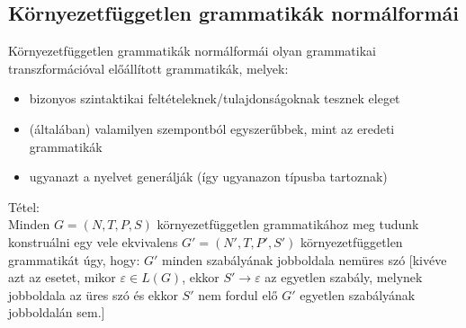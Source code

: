 \documentclass[margin=0px]{article}
\begin{document}
\subsection{Környezetfüggetlen grammatikák normálformái}
Környezetfüggetlen grammatikák normálformái olyan grammatikai transzformációval előállított  grammatikák, melyek:
\begin{itemize}
    \item bizonyos szintaktikai feltételeknek/tulajdonságoknak tesznek eleget
    \item (általában) valamilyen szempontból egyszerűbbek, mint az eredeti grammatikák
    \item ugyanazt a nyelvet generálják (így ugyanazon típusba tartoznak)
\end{itemize}
Tétel:\\
Minden $G = (N, T, P, S)$ környezetfüggetlen grammatikához meg tudunk konstruálni egy vele ekvivalens $G' = (N', T, P', S')$ környezetfüggetlen grammatikát úgy, hogy: $G'$ minden szabályának jobboldala nemüres szó [kivéve azt az esetet, mikor $\varepsilon \in L(G)$, ekkor $S' \rightarrow \varepsilon$ az egyetlen szabály, melynek jobboldala az üres szó és ekkor $S'$ nem fordul elő $G'$ egyetlen szabályának jobboldalán sem.]
\end{document}
